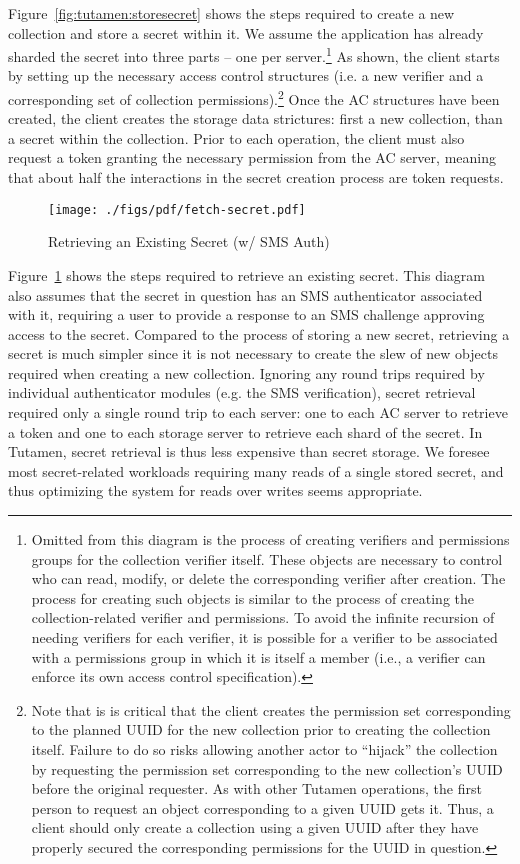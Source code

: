 Figure~\ref{fig:tutamen:storesecret} shows the steps required to
create a new collection and store a secret within it. We assume the
application has already sharded the secret into three parts -- one per
server.\footnote{Omitted from this diagram is the process of creating
  verifiers and permissions groups for the collection verifier
  itself. These objects are necessary to control who can read, modify,
  or delete the corresponding verifier after creation. The process for
  creating such objects is similar to the process of creating the
  collection-related verifier and permissions. To avoid the infinite
  recursion of needing verifiers for each verifier, it is possible for
  a verifier to be associated with a permissions group in which it is
  itself a member (i.e., a verifier can enforce its own access control
  specification).} As shown, the client starts by setting up the
necessary access control structures (i.e. a new verifier and a
corresponding set of collection permissions).\footnote{Note that is is
  critical that the client creates the permission set corresponding to
  the planned UUID for the new collection prior to creating the
  collection itself. Failure to do so risks allowing another actor to
  ``hijack'' the collection by requesting the permission set
  corresponding to the new collection's UUID before the original
  requester. As with other Tutamen operations, the first person to
  request an object corresponding to a given UUID gets it. Thus, a
  client should only create a collection using a given UUID after they
  have properly secured the corresponding permissions for the UUID in
  question.} Once the AC structures have been created, the client
creates the storage data strictures: first a new collection, than a
secret within the collection. Prior to each operation, the client must
also request a token granting the necessary permission from the AC
server, meaning that about half the interactions in the secret
creation process are token requests.

\begin{figure}[th]
  \centering
  \texttt{[image: ./figs/pdf/fetch-secret.pdf]}
  \caption{Retrieving an Existing Secret (w/ SMS Auth)}
  \label{fig:tutamen:fetchsecret}
\end{figure}

Figure~\ref{fig:tutamen:fetchsecret} shows the steps required to
retrieve an existing secret. This diagram also assumes that the secret
in question has an SMS authenticator associated with it, requiring a
user to provide a response to an SMS challenge approving access to the
secret. Compared to the process of storing a new secret, retrieving a
secret is much simpler since it is not necessary to create the slew of
new objects required when creating a new collection. Ignoring any
round trips required by individual authenticator modules (e.g. the SMS
verification), secret retrieval required only a single round trip to
each server: one to each AC server to retrieve a token and one to each
storage server to retrieve each shard of the secret. In Tutamen,
secret retrieval is thus less expensive than secret storage. We
foresee most secret-related workloads requiring many reads of a single
stored secret, and thus optimizing the system for reads over writes
seems appropriate.

